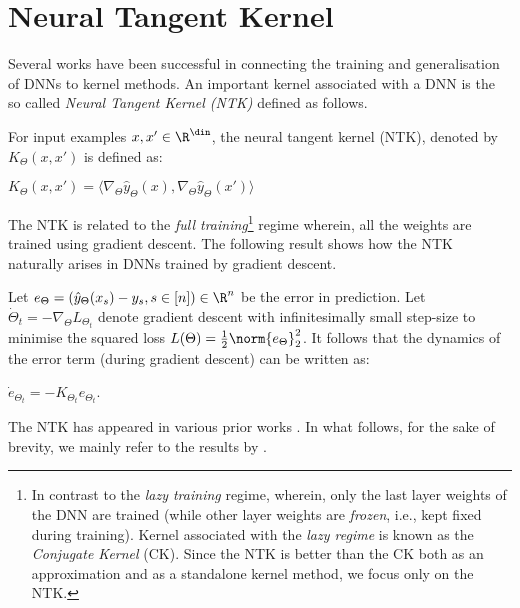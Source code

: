 \section{Neural Tangent Kernel}\label{sec:ntk}
Several works \cite{ntk,fcgp,convgp,arora2019exact,arora} have been successful in connecting the training and generalisation of DNNs to kernel methods. An important kernel associated with a DNN is the so called \emph{Neural Tangent Kernel (NTK)} defined as follows.
\begin{definition}\label{def:ntk}
 For input examples $x,x'\in\R^{\din}$, the neural tangent kernel (NTK), denoted by $K_{\Theta}(x,x')$ is defined as:
\centerline{$
K_{\Theta}(x,x') = \langle\nabla_{\Theta} \hat{y}_{\Theta}(x), \nabla_{\Theta} \hat{y}_{\Theta}(x') \rangle
$}
\end{definition}
The NTK is related to the \emph{full training}\footnote{In contrast to the \emph{lazy training} regime, wherein, only the last layer weights of the DNN are trained (while other layer weights are \emph{frozen}, i.e., kept fixed during training). Kernel associated with the \emph{lazy regime} is known as the \emph{Conjugate Kernel} (CK). Since the NTK  \cite{arora2019exact} is better than the CK \cite{convgp} both as an approximation and as a standalone kernel method, we focus only on the NTK.}  regime wherein, all the weights are trained using gradient descent. The following result shows how the NTK naturally arises in DNNs trained by gradient descent.
\begin{proposition}\label{prop:basic}
Let $e_{\Theta}=\left(\hat{y}_{\Theta}(x_s)-y_s,s\in[n]\right)\in\R^n$ be the error in prediction. Let $\dot{\Theta}_t=-\nabla_{\Theta}L_{\Theta_t}$ denote gradient descent  with infinitesimally small step-size to minimise the  squared loss $L(\Theta)=\frac{1}{2}\norm{e_{\Theta}}_2^2$. It follows that the dynamics of the error term (during gradient descent) can be written as:\\ \centerline{$\dot{e}_{\Theta_t}=-K_{\Theta_t} e_{\Theta_t}$.} 
\end{proposition}
The NTK has appeared in various prior works \cite{ntk,dudnn,arora2019exact,cao2019generalization}. In what follows, for the sake of brevity, we mainly refer to the results by \citet{arora2019exact}. 

